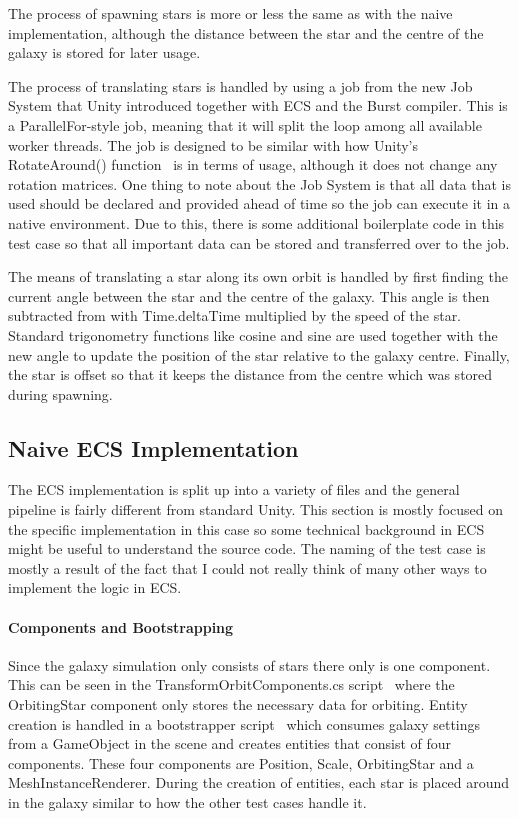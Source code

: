 The process of spawning stars is more or less the same as with the naive implementation, although the distance between the star and the centre of the galaxy is stored for later usage. 

The process of translating stars is handled by using a job from the new Job System that Unity introduced together with ECS and the Burst compiler. This is a ParallelFor-style job, meaning that it will split the loop among all available worker threads. The job is designed to be similar with how Unity's RotateAround() function~\cite{rotateAroundFunction} is in terms of usage, although it does not change any rotation matrices. One thing to note about the Job System is that all data that is used should be declared and provided ahead of time so the job can execute it in a native environment. Due to this, there is some additional boilerplate code in this test case so that all important data can be stored and transferred over to the job. 

The means of translating a star along its own orbit is handled by first finding the current angle between the star and the centre of the galaxy. This angle is then subtracted from with Time.deltaTime multiplied by the speed of the star. Standard trigonometry functions like cosine and sine are used together with the new angle to update the position of the star relative to the galaxy centre. Finally, the star is offset so that it keeps the distance from the centre which was stored during spawning. 

\subsection{Naive ECS Implementation}
The ECS implementation is split up into a variety of files and the general pipeline is fairly different from standard Unity. This section is mostly focused on the specific implementation in this case so some technical background in ECS might be useful to understand the source code. The naming of the test case is mostly a result of the fact that I could not really think of many other ways to implement the logic in ECS.

\paragraph{Components and Bootstrapping}
Since the galaxy simulation only consists of stars there only is one component. This can be seen in the TransformOrbitComponents.cs script~\cite{transformOrbitComponent} where the OrbitingStar component only stores the necessary data for orbiting. Entity creation is handled in a bootstrapper script~\cite{bootstrapper} which consumes galaxy settings from a GameObject in the scene and creates entities that consist of four components. These four components are Position, Scale, OrbitingStar and a MeshInstanceRenderer. During the creation of entities, each star is placed around in the galaxy similar to how the other test cases handle it. 

